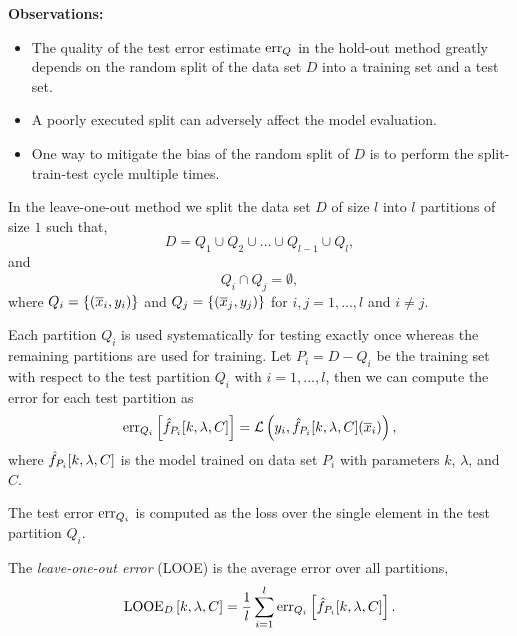 \documentclass[a4paper,blends,pdf,colorBG,slideColor]{prosper}
\begin{document}

{\bf Observations:} 
\begin{itemize}
\item The quality of the test error estimate $\mbox{err}_Q$
in the hold-out method 
greatly depends on the random split of the data set $D$ into a training set and a
test set.  
\item A poorly executed split can adversely affect the model evaluation.

\item One way to mitigate the bias of the random split of $D$ is to perform the split-train-test cycle multiple times.
\end{itemize}
\es

In the leave-one-out method  we split the data set $D$ of size $l$
into $l$ partitions of size $1$ such that,
\begin{equation*}
D = Q_1\cup Q_2 \cup \ldots \cup Q_{l-1} \cup Q_{l},
\end{equation*}
and
\begin{equation*}
Q_i \cap Q_j = \emptyset,
\end{equation*}
where $Q_i = \{ (\overline{x}_i, y_i)\}$ and $Q_j = \{ (\overline{x}_j, y_j)\}$
for $i,j = 1,\ldots, l$ and $i \ne j$.

Each partition $Q_i$ is used systematically for testing exactly once whereas the
remaining  partitions are used for training.  
Let $P_i = D - Q_i$ be the training set with respect to the test partition $Q_i$ with $i = 1,\ldots, l$,
then we can compute the error for each test partition as
\begin{equation*}
\mbox{err}_{Q_i}\left [\hat{f}_{P_i}[k,\lambda,C]\right] = {\cal L}\left (y_i,\hat{f}_{P_i}[k,\lambda,C](\overline{x}_i)\right ),
\end{equation*}
where $\hat{f}_{P_i}[k,\lambda,C]$
is the model trained on data set $P_i$ with parameters $k$, $\lambda$, and $C$.

The test error $\mbox{err}_{Q_i}$ is computed as the loss over the single element in the test partition $Q_i$.

\es


The {\em leave-one-out error} (LOOE) is the average error over all partitions,
\begin{equation*}
\text{LOOE}_D\left [k,\lambda,C \right ] 
	= \frac{1}{l} \sum_{i=1}^l \mbox{err}_{Q_i}\left [\hat{f}_{P_i}[k,\lambda,C]\right].
\end{equation*}
\end{document}
